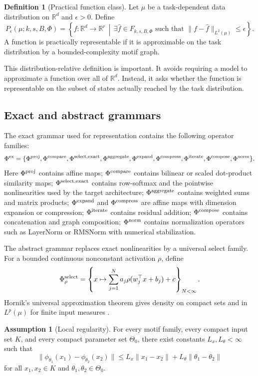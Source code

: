 \documentclass[11pt]{article}
\theoremstyle{definition}
\newtheorem{definition}[theorem]{Definition}
\newtheorem{assumption}[theorem]{Assumption}
\newcommand{\R}{\mathbb{R}}
\begin{document}
\begin{definition}[Practical function class]
Let \(\mu\) be a task-dependent data distribution on \(\R^d\) and \(\epsilon>0\). Define
\[
P_\epsilon(\mu;k,s,B,\Phi)=\left\{f:\R^d\to\R^r\,\middle|\,\exists \hat f\in F_{k,s,B,\Phi}\text{ such that }\|f-\hat f\|_{L^2(\mu)}\le \epsilon\right\}.
\]
A function is practically representable if it is approximable on the task distribution by a bounded-complexity motif graph.
\end{definition}

This distribution-relative definition is important. It avoids requiring a model to approximate a function over all of \(\R^d\). Instead, it asks whether the function is representable on the subset of states actually reached by the task distribution.

\subsection{Exact and abstract grammars}

The exact grammar used for representation contains the following operator families:
\[
\Phi^{\rm ex}=\{\Phi^{\rm proj},\Phi^{\rm compare},\Phi^{\rm select,exact},\Phi^{\rm aggregate},\Phi^{\rm expand},\Phi^{\rm compress},\Phi^{\rm iterate},\Phi^{\rm compose},\Phi^{\rm norm}\}.
\]
Here \(\Phi^{\rm proj}\) contains affine maps; \(\Phi^{\rm compare}\) contains bilinear or scaled dot-product similarity maps; \(\Phi^{\rm select,exact}\) contains row-softmax and the pointwise nonlinearities used by the target architecture; \(\Phi^{\rm aggregate}\) contains weighted sums and matrix products; \(\Phi^{\rm expand}\) and \(\Phi^{\rm compress}\) are affine maps with dimension expansion or compression; \(\Phi^{\rm iterate}\) contains residual addition; \(\Phi^{\rm compose}\) contains concatenation and graph composition; \(\Phi^{\rm norm}\) contains normalization operators such as LayerNorm or RMSNorm with numerical stabilization.

The abstract grammar replaces exact nonlinearities by a universal select family. For a bounded continuous nonconstant activation \(\rho\), define
\[
  \Phi^{\rm select}_\rho = \left\{x\mapsto \sum_{j=1}^N a_j\rho(w_j^\top x+b_j)+c\right\}_{N<\infty}.
\]
Hornik's universal approximation theorem gives density on compact sets and in \(L^p(\mu)\) for finite input measures \cite{hornik1991}.

\begin{assumption}[Local regularity]
For every motif family, every compact input set \(K\), and every compact parameter set \(\Theta_0\), there exist constants \(L_x,L_\theta<\infty\) such that
\[
 \|\phi_{\theta_1}(x_1)-\phi_{\theta_2}(x_2)\|
 \le L_x\|x_1-x_2\|+L_\theta\|\theta_1-\theta_2\|
\]
for all \(x_1,x_2\in K\) and \(\theta_1,\theta_2\in\Theta_0\).
\end{assumption}
\end{document}

